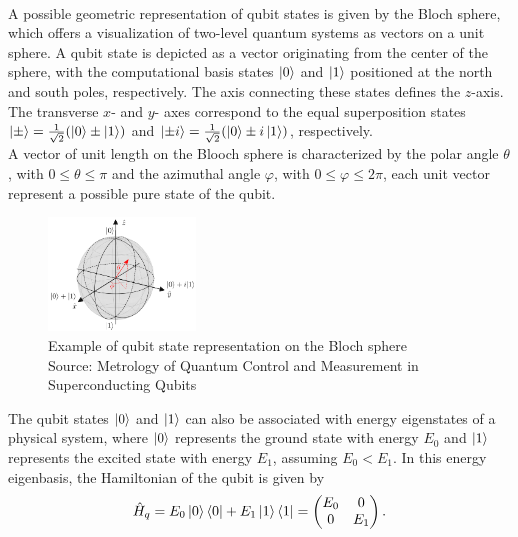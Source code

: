 \paragraph{}
A possible geometric representation of qubit states is given by the Bloch sphere, which offers a visualization of two-level quantum systems as vectors on a unit sphere.  
A qubit state is depicted as a vector originating from the center of the sphere, with the computational basis states $\ket{0}$ and $\ket{1}$ positioned at the north and south poles, respectively.
The axis connecting these states defines the $z$-axis. The transverse $x$- and $y$- axes correspond to the equal superposition states $\ket{\pm} = \frac{1}{\sqrt{2}}(\ket{0}\pm\ket{1})$ and $\ket{\pm i} = \frac{1}{\sqrt{2}}(\ket{0}\pm i\ket{1})$, respectively.\\
A vector of unit length on the Blooch sphere is characterized by the polar angle $\theta$, with $0\leq\theta\leq\pi$ and the azimuthal angle $\varphi$, with $0\leq\varphi\leq 2\pi$, each unit vector represent a possible pure state of the qubit.\\

\begin{figure}[h!]
\centering
\includegraphics[width=0.35\textwidth]{figures/png/BlochSphere.png}
\caption{Example of qubit state representation on the Bloch sphere\\
Source: Metrology of Quantum Control and Measurement in Superconducting Qubits \cite{Chen2018}}
\label{fig:BlochSphere}
\end{figure}

The qubit states $\ket{0}$ and $\ket{1}$ can also be associated with energy eigenstates of a physical system, where $\ket{0}$ represents the ground state with energy $E_0$ and $\ket{1}$ represents the excited state with energy $E_1$, assuming $E_0 < E_1$. 
In this energy eigenbasis, the Hamiltonian of the qubit is given by
\begin{equation}\label{eq:qubithamiltonian}
    \hat{H}_q = E_0 \ket{0} \bra{0} + E_1 \ket{1} \bra{1} = 
    \begin{pmatrix}
        E_0 & 0 \\
        0 & E_1
    \end{pmatrix}.
\end{equation}

